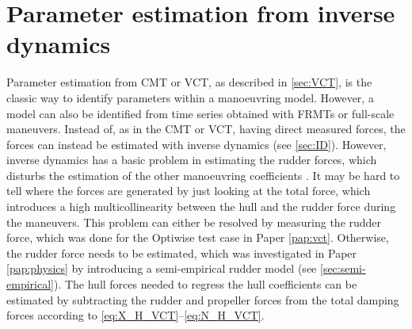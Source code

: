 \section{Parameter estimation from inverse dynamics} \label{sec:IDR}
Parameter estimation from CMT or VCT, as described in \autoref{sec:VCT}, is the classic way to identify parameters within a manoeuvring model. However, a model can also be identified from time series obtained with FRMTs or full-scale maneuvers. Instead of, as in the CMT or VCT, having direct measured forces, the forces can instead be estimated with inverse dynamics (see \autoref{sec:ID}). However, inverse dynamics has a basic problem in estimating the rudder forces, which disturbs the estimation of the other manoeuvring coefficients \cite{arakiEstimatingManoeuvringCoefficients2012}. It may be hard to tell where the forces are generated by just looking at the total force, which introduces a high multicollinearity between the hull and the rudder force during the maneuvers.
This problem can either be resolved by measuring the rudder force, which was done for the Optiwise test case in Paper \ref{pap:vct}. Otherwise, the rudder force needs to be estimated, which was investigated in Paper \ref{pap:physics} by introducing a semi-empirical rudder model (see \autoref{sec:semi-empirical}). The hull forces needed to regress the hull coefficients can be estimated by subtracting the rudder and propeller forces from the total damping forces according to \autoref{eq:X_H_VCT}--\autoref{eq:N_H_VCT}.




